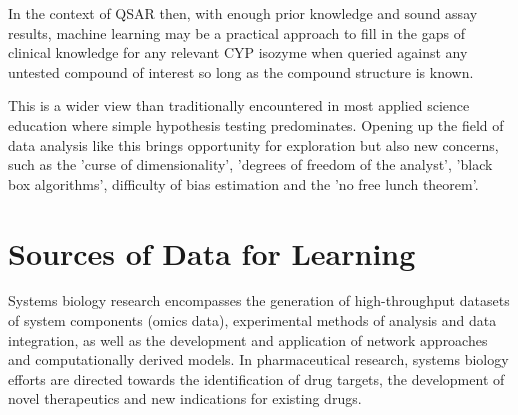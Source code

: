 In the context of QSAR then, with enough prior knowledge and sound assay results, machine learning may be a practical approach to fill in the gaps of clinical knowledge for any relevant CYP isozyme when queried against any untested compound of interest so long as the compound structure is known.

This is a wider view than traditionally encountered in most applied science education where simple hypothesis testing predominates. Opening up the field of data analysis like this brings opportunity for exploration but also new concerns, such as the 'curse of dimensionality', 'degrees of freedom of the analyst', 'black box algorithms', difficulty of bias estimation and the 'no free lunch theorem'. \cite{Boulesteix2014}








\section{Sources of Data for Learning}

Systems biology research encompasses the generation of high-throughput datasets of system components (omics data), experimental methods of analysis and data integration, as well as the development and application of network approaches and computationally derived models. \cite{Berg2014} In pharmaceutical research, systems biology efforts are directed towards the identification of drug targets, the development of novel therapeutics and new indications for existing drugs.

